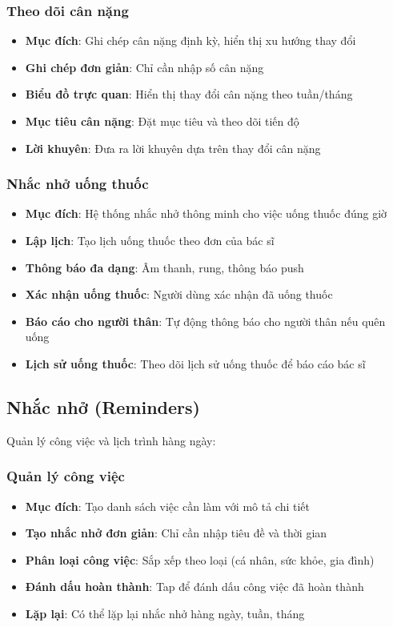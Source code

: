 \documentclass[12pt,a4paper]{article}
\begin{document}
\subsubsection{Theo dõi cân nặng}
\begin{itemize}[leftmargin=2cm]
    \item \textbf{Mục đích}: Ghi chép cân nặng định kỳ, hiển thị xu hướng thay đổi
    \item \textbf{Ghi chép đơn giản}: Chỉ cần nhập số cân nặng
    \item \textbf{Biểu đồ trực quan}: Hiển thị thay đổi cân nặng theo tuần/tháng
    \item \textbf{Mục tiêu cân nặng}: Đặt mục tiêu và theo dõi tiến độ
    \item \textbf{Lời khuyên}: Đưa ra lời khuyên dựa trên thay đổi cân nặng
\end{itemize}

\subsubsection{Nhắc nhở uống thuốc}
\begin{itemize}[leftmargin=2cm]
    \item \textbf{Mục đích}: Hệ thống nhắc nhở thông minh cho việc uống thuốc đúng giờ
    \item \textbf{Lập lịch}: Tạo lịch uống thuốc theo đơn của bác sĩ
    \item \textbf{Thông báo đa dạng}: Âm thanh, rung, thông báo push
    \item \textbf{Xác nhận uống thuốc}: Người dùng xác nhận đã uống thuốc
    \item \textbf{Báo cáo cho người thân}: Tự động thông báo cho người thân nếu quên uống
    \item \textbf{Lịch sử uống thuốc}: Theo dõi lịch sử uống thuốc để báo cáo bác sĩ
\end{itemize}

\subsection{Nhắc nhở (Reminders)}
Quản lý công việc và lịch trình hàng ngày:

\subsubsection{Quản lý công việc}
\begin{itemize}[leftmargin=2cm]
    \item \textbf{Mục đích}: Tạo danh sách việc cần làm với mô tả chi tiết
    \item \textbf{Tạo nhắc nhở đơn giản}: Chỉ cần nhập tiêu đề và thời gian
    \item \textbf{Phân loại công việc}: Sắp xếp theo loại (cá nhân, sức khỏe, gia đình)
    \item \textbf{Đánh dấu hoàn thành}: Tap để đánh dấu công việc đã hoàn thành
    \item \textbf{Lặp lại}: Có thể lặp lại nhắc nhở hàng ngày, tuần, tháng
\end{itemize}
\end{document}
